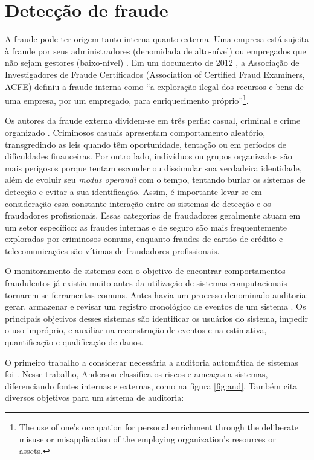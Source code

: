 \chapter{Detecção de fraude}

A fraude pode ter origem tanto interna quanto externa. Uma empresa está sujeita à fraude por seus administradores (denomidada de alto-nível) ou empregados que não sejam gestores (baixo-nível) \cite{Phau2010}. Em um documento de 2012 \cite{ACFE2012}, a Associação de Investigadores de Fraude Certificados (Association of Certified Fraud Examiners, ACFE) definiu a fraude interna como ``a exploração ilegal dos recursos e bens de uma empresa, por um empregado, para enriquecimento próprio''\footnote{The use of one’s occupation for personal enrichment through the deliberate misuse or misapplication of the employing organization’s resources or assets.}.

Os autores da fraude externa dividem-se em três perfis: casual, criminal e crime organizado \cite{Phua2010}. Criminosos casuais apresentam comportamento aleatório, transgredindo as leis quando têm oportunidade, tentação ou em períodos de dificuldades financeiras. Por outro lado, indivíduos ou grupos organizados são mais perigosos porque tentam esconder ou dissimular sua verdadeira identidade, além de evoluir seu \emph{modus operandi} com o tempo, tentando burlar os sistemas de detecção e evitar a sua identificação. Assim, é importante levar-se em consideração essa constante interação entre os sistemas de detecção e os fraudadores profissionais. Essas categorias de fraudadores geralmente atuam em um setor específico: as fraudes internas e de seguro são mais frequentemente exploradas por criminosos comuns, enquanto fraudes de cartão de crédito e telecomunicações são vítimas de fraudadores profissionais.

O monitoramento de sistemas com o objetivo de encontrar comportamentos fraudulentos já existia muito antes da utilização de sistemas computacionais tornarem-se ferramentas comuns. Antes havia um processo denominado auditoria: gerar, armazenar e revisar um registro cronológico de eventos de um sistema \cite[p. 7]{Bace2000}. Os principais objetivos desses sistemas são identificar os usuários do sistema, impedir o uso impróprio, e auxiliar na reconstrução de eventos e na estimativa, quantificação e qualificação de danos.

O primeiro trabalho a considerar necessária a auditoria automática de sistemas foi \citet{Anderson1972}. Nesse trabalho, Anderson classifica os riscos e ameaças a sistemas, diferenciando fontes internas e externas, como na figura \ref{fig:and}. Também cita diversos objetivos para um sistema de auditoria:


